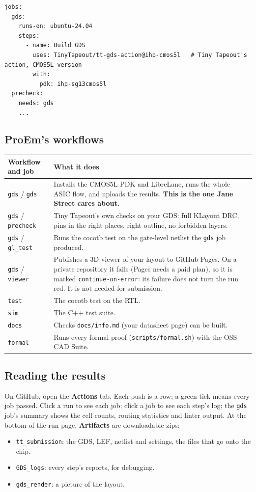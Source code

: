 \documentclass[11pt,a4paper]{article}
\newcommand{\file}[1]{\texttt{#1}}
\newcommand{\cmd}[1]{\texttt{#1}}
\begin{document}
\begin{lstlisting}
jobs:
  gds:
    runs-on: ubuntu-24.04
    steps:
      - name: Build GDS
        uses: TinyTapeout/tt-gds-action@ihp-cmos5l   # Tiny Tapeout's action, CMOS5L version
        with:
          pdk: ihp-sg13cmos5l
  precheck:
    needs: gds
    ...
\end{lstlisting}

\subsection{ProEm's workflows}

\begin{center}
\begin{tabularx}{\linewidth}{@{}lX@{}}
\toprule
Workflow and job & What it does \\
\midrule
\cmd{gds} / \texttt{gds} & Installs the CMOS5L PDK and LibreLane, runs the whole ASIC flow, and uploads the results. \textbf{This is the one Jane Street cares about.} \\
\cmd{gds} / \texttt{precheck} & Tiny Tapeout's own checks on your GDS: full KLayout DRC, pins in the right places, right outline, no forbidden layers. \\
\cmd{gds} / \texttt{gl\_test} & Runs the cocotb test on the gate-level netlist the \texttt{gds} job produced. \\
\cmd{gds} / \texttt{viewer} & Publishes a 3D viewer of your layout to GitHub Pages. On a private repository it fails (Pages needs a paid plan), so it is marked \texttt{continue-on-error}: its failure does not turn the run red. It is not needed for submission. \\
\cmd{test} & The cocotb test on the RTL. \\
\cmd{sim} & The C++ test suite. \\
\cmd{docs} & Checks \file{docs/info.md} (your datasheet page) can be built. \\
\cmd{formal} & Runs every formal proof (\file{scripts/formal.sh}) with the OSS CAD Suite. \\
\bottomrule
\end{tabularx}
\end{center}

\subsection{Reading the results}

On GitHub, open the \textbf{Actions} tab. Each push is a row; a green tick means every job passed. Click a run to see each job; click a job to see each step's log; the \texttt{gds} job's summary shows the cell counts, routing statistics and linter output. At the bottom of the run page, \textbf{Artifacts} are downloadable zips:
\begin{itemize}
\item \texttt{tt\_submission}: the GDS, LEF, netlist and settings, the files that go onto the chip.
\item \texttt{GDS\_logs}: every step's reports, for debugging.
\item \texttt{gds\_render}: a picture of the layout.
\end{itemize}
\end{document}
